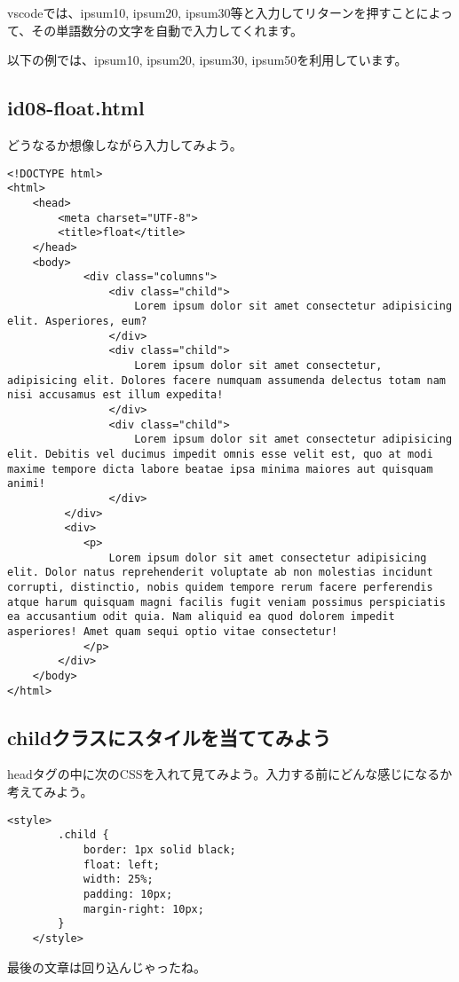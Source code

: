 \documentclass[mingoth,11pt,a4j,uplatex]{jsarticle}
\begin{document}
vscodeでは、ipsum10, ipsum20, ipsum30等と入力してリターンを押すことによって、その単語数分の文字を自動で入力してくれます。

以下の例では、ipsum10, ipsum20, ipsum30, ipsum50を利用しています。



\subsection{id08-float.html}
どうなるか想像しながら入力してみよう。
\begin{lstlisting}[caption=HTML部分]
<!DOCTYPE html>
<html>
	<head>
		<meta charset="UTF-8">
		<title>float</title>
	</head>
	<body>
    		<div class="columns">
		        <div class="child">
		            Lorem ipsum dolor sit amet consectetur adipisicing elit. Asperiores, eum?
		        </div>
		        <div class="child">
		            Lorem ipsum dolor sit amet consectetur, adipisicing elit. Dolores facere numquam assumenda delectus totam nam nisi accusamus est illum expedita!
		        </div>
		        <div class="child">
		            Lorem ipsum dolor sit amet consectetur adipisicing elit. Debitis vel ducimus impedit omnis esse velit est, quo at modi maxime tempore dicta labore beatae ipsa minima maiores aut quisquam animi!
		        </div>
		 </div>
		 <div>
			<p>
				Lorem ipsum dolor sit amet consectetur adipisicing elit. Dolor natus reprehenderit voluptate ab non molestias incidunt corrupti, distinctio, nobis quidem tempore rerum facere perferendis atque harum quisquam magni facilis fugit veniam possimus perspiciatis ea accusantium odit quia. Nam aliquid ea quod dolorem impedit asperiores! Amet quam sequi optio vitae consectetur!
			</p>
		</div>
	</body>
</html>
\end{lstlisting}


\subsection{childクラスにスタイルを当ててみよう}
headタグの中に次のCSSを入れて見てみよう。入力する前にどんな感じになるか考えてみよう。
\begin{lstlisting}[caption=CSS部分1]
    <style>
        .child {
            border: 1px solid black;
            float: left;
            width: 25%;
            padding: 10px;
            margin-right: 10px;
        }
    </style>

\end{lstlisting}
最後の文章は回り込んじゃったね。
\end{document}
